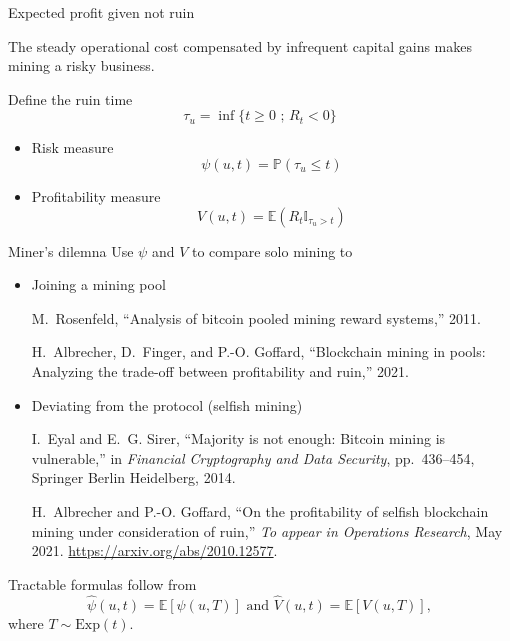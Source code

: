 \documentclass{beamer}
\begin{document}
\begin{frame}{Expected profit given not ruin}
\scriptsize

\begin{tcolorbox}[enhanced,drop shadow, title=Fact]
The steady operational cost compensated by infrequent capital gains makes mining a risky business.
\end{tcolorbox}
Define the ruin time 
$$
\tau_u  = \inf\{t\geq0\text{ ; }R_t <0\}
$$
\begin{itemize}
  \item Risk measure 
  $$
  \psi(u,t) = \mathbb{P}(\tau_u \leq t)
  $$
  \item Profitability measure
  $$
  V(u,t) = \mathbb{E}(R_t\mathbb{I}_{\tau_u > t})
  $$
\end{itemize} 
\end{frame}
\begin{frame}{Miner's dilemna} 
\scriptsize
Use $\psi$ and $V$ to compare solo mining to
\begin{itemize}
  \item Joining a mining pool
\tiny
  \begin{thebibliography}{1}

M.~Rosenfeld, ``Analysis of bitcoin pooled mining reward systems,'' 2011.

H.~Albrecher, D.~Finger, and P.-O. Goffard, ``Blockchain mining in pools:
  Analyzing the trade-off between profitability and ruin,'' 2021.


\end{thebibliography}
  \item \scriptsize Deviating from the protocol (selfish mining)

  \tiny
  \begin{thebibliography}{1}
I.~Eyal and E.~G. Sirer, ``Majority is not enough: Bitcoin mining is
  vulnerable,'' in {\em Financial Cryptography and Data Security},
  pp.~436--454, Springer Berlin Heidelberg, 2014.

H.~Albrecher and P.-O. Goffard, ``{On the profitability of selfish blockchain
  mining under consideration of ruin},'' {\em To appear in Operations
  Research}, May 2021.
\newblock \url{https://arxiv.org/abs/2010.12577}.
\end{thebibliography}
\end{itemize}
Tractable formulas follow from 
$$
\widehat{\psi}(u,t)= \mathbb{E}[\psi(u,T)]\text{ and }\widehat{V}(u,t)= \mathbb{E}[V(u,T)],
$$
where $T\sim\text{Exp}(t)$.
\end{frame}
\end{document}
